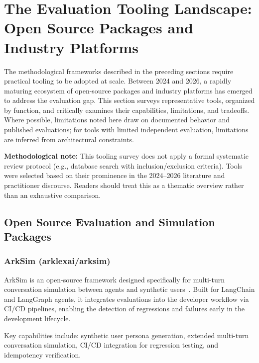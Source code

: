 \section{The Evaluation Tooling Landscape: Open Source Packages and Industry Platforms}
\label{sec:tooling}

The methodological frameworks described in the preceding sections require practical tooling to be adopted at scale. Between 2024 and 2026, a rapidly maturing ecosystem of open-source packages and industry platforms has emerged to address the evaluation gap. This section surveys representative tools, organized by function, and critically examines their capabilities, limitations, and tradeoffs. Where possible, limitations noted here draw on documented behavior and published evaluations; for tools with limited independent evaluation, limitations are inferred from architectural constraints.

\textbf{Methodological note:} This tooling survey does not apply a formal systematic review protocol (e.g., database search with inclusion/exclusion criteria). Tools were selected based on their prominence in the 2024--2026 literature and practitioner discourse. Readers should treat this as a thematic overview rather than an exhaustive comparison.

\subsection{Open Source Evaluation and Simulation Packages}

\subsubsection{ArkSim (arklexai/arksim)}

ArkSim is an open-source framework designed specifically for multi-turn conversation simulation between agents and synthetic users~\citep{arksim_primary}. Built for LangChain and LangGraph agents, it integrates evaluations into the developer workflow via CI/CD pipelines, enabling the detection of regressions and failures early in the development lifecycle.

Key capabilities include: synthetic user persona generation, extended multi-turn conversation simulation, CI/CD integration for regression testing, and idempotency verification.

